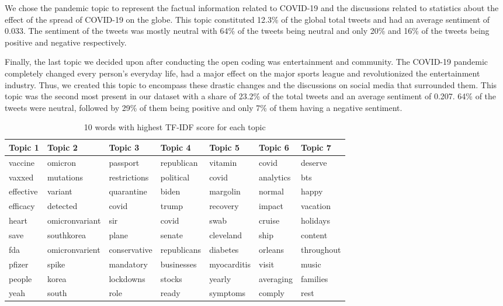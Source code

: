 \documentclass[letterpaper]{article} %
\begin{document}
We chose the pandemic topic to represent the factual information related to COVID-19 and  the discussions related to statistics about the effect of the spread of COVID-19 on the globe. This topic constituted 12.3\% of the global total tweets and had an average sentiment of 0.033. The sentiment of the tweets was mostly neutral with 64\% of the tweets being neutral and only 20\% and 16\% of the tweets being positive and negative respectively.

Finally, the last topic we decided upon after conducting the open coding was entertainment and community. The COVID-19 pandemic completely changed every person's everyday life, had a major effect on the major sports league and revolutionized the entertainment industry. Thus, we created this topic to encompass these drastic changes and the discussions on social media that surrounded them. This topic was the second most present in our dataset with a share of 23.2\% of the total tweets and an average sentiment of 0.207. 64\% of the tweets were neutral, followed by 29\% of them being positive and only 7\% of them having a negative sentiment.
\begin{table}[ht]
\centering
\caption{10 words with highest TF-IDF score for each topic}
 \centering
\begin{tabular}{ |M{2cm}|M{2cm}|M{2cm}|M{2cm}|M{2cm}|M{2cm}|M{2cm}| }
 \hline
 Topic 1 & Topic 2 & Topic 3 & Topic 4 & Topic 5 & Topic 6 & Topic 7\\
 \hline 
vaccine & omicron & passport & republican & vitamin & covid & deserve\\
vaxxed & mutations & restrictions & political & covid & analytics & bts\\
effective & variant & quarantine & biden & margolin & normal & happy\\
efficacy & detected & covid & trump & recovery & impact & vacation\\
heart & omicronvariant & sir & covid & swab & cruise & holidays\\
save & southkorea & plane & senate & cleveland & ship & content\\
fda & omicronvarient & conservative & republicans & diabetes & orleans & throughout\\
pfizer & spike & mandatory & businesses & myocarditis & visit & music\\
people & korea & lockdowns & stocks & yearly & averaging & families\\
yeah & south & role & ready & symptoms & comply & rest\\
 \hline
\end{tabular}
\end{table}
\end{document}
